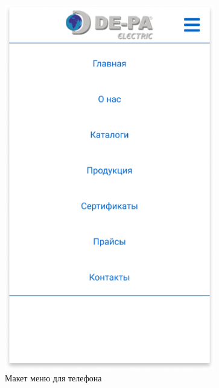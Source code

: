 \begin{figure}[!hp]
    \centering
    \includegraphics[height=16cm]
        {_assets/gpi_pz_android_menu.png}
    \caption{Макет меню для телефона}
    \label{fig:gpi_pz_phone_menu}
\end{figure}

\newpage
